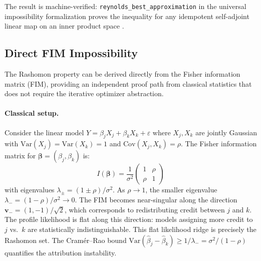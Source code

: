 \documentclass{article}
\newcommand{\Var}{\mathrm{Var}}
\begin{document}
The result is machine-verified: \texttt{reynolds\_best\_approximation} in the universal impossibility formalization proves the inequality for any idempotent self-adjoint linear map on an inner product space \citep{caraker2026limits}.

\subsection{Direct FIM Impossibility}
\label{sec:fim}

The Rashomon property can be derived directly from the Fisher information matrix (FIM), providing an independent proof path from classical statistics that does not require the iterative optimizer abstraction.

\paragraph{Classical setup.}
Consider the linear model $Y = \beta_j X_j + \beta_k X_k + \varepsilon$ where $X_j, X_k$ are jointly Gaussian with $\Var(X_j) = \Var(X_k) = 1$ and $\text{Cov}(X_j, X_k) = \rho$. The Fisher information matrix for $\boldsymbol{\beta} = (\beta_j, \beta_k)$ is:
\[
    I(\boldsymbol{\beta}) = \frac{1}{\sigma^2}\begin{pmatrix} 1 & \rho \\ \rho & 1 \end{pmatrix}
\]
with eigenvalues $\lambda_\pm = (1 \pm \rho)/\sigma^2$. As $\rho \to 1$, the smaller eigenvalue $\lambda_- = (1-\rho)/\sigma^2 \to 0$. The FIM becomes near-singular along the direction $\boldsymbol{v}_- = (1, -1)/\sqrt{2}$, which corresponds to redistributing credit between $j$ and $k$. The profile likelihood is flat along this direction: models assigning more credit to $j$ vs.\ $k$ are statistically indistinguishable. This flat likelihood ridge is precisely the Rashomon set. The Cram\'er--Rao bound $\Var(\hat\beta_j - \hat\beta_k) \geq 1/\lambda_- = \sigma^2/(1-\rho)$ quantifies the attribution instability.
\end{document}
